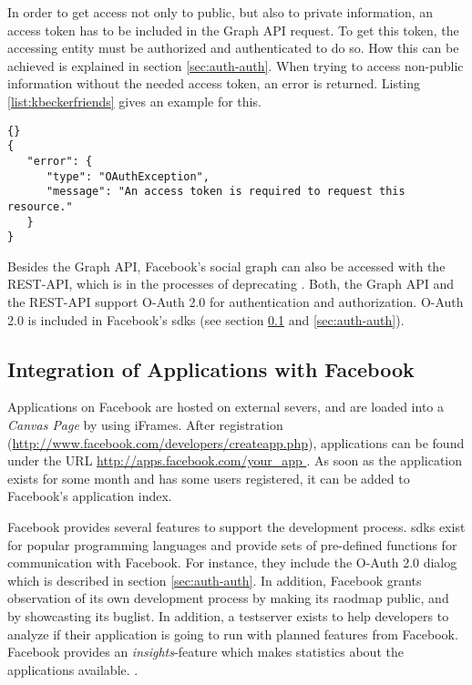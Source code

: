 \documentclass[preprint,12pt]{elsarticle}
\begin{document}
In order to get access not only to public, but also to private
information, an access token has to be included in the Graph API
request. To get this token, the accessing entity must be
authorized and authenticated to do so. How this can be achieved is
explained in section \ref{sec:auth-auth}. When trying to access
non-public information without the needed access token, an error
is returned. Listing \ref{list:kbeckerfriends} gives an example for this.


\begin{lstlisting}[caption=JSON object from
  \url{https://graph.facebook.com/681178092/friends},
  label=list:kbeckerfriends]{}
{
   "error": {
      "type": "OAuthException",
      "message": "An access token is required to request this resource."
   }
}
\end{lstlisting}


Besides the Graph API, Facebook's social graph can also be accessed
with the REST-API, which is in the processes of deprecating
\cite{facebookDev3}. Both, the Graph API and the REST-API support
O-Auth 2.0 for authentication and authorization. O-Auth 2.0 is
included in Facebook's \ac{sdks} (see section
\ref{sec:integr-appl-with} and \ref{sec:auth-auth}).




\subsection{Integration of Applications with Facebook}
\label{sec:integr-appl-with}
Applications on Facebook are hosted on external severs, and are loaded
into a \textit{Canvas Page} by using iFrames. After registration
(\url{http://www.facebook.com/developers/createapp.php}), applications
can be found under the URL \url{http://apps.facebook.com/your_app }.
As soon as the application exists for some month and has
some users registered, it can be added to Facebook's application
index. 

Facebook provides several features to support the development
process. \ac{sdks} exist for popular programming languages and provide
sets of pre-defined functions for communication with Facebook. For
instance, they include the O-Auth 2.0 dialog which is described in
section \ref{sec:auth-auth}. In
addition, Facebook grants observation of its own development process by
making its raodmap public, and by showcasting its buglist. In addition, a
testserver exists to help developers to analyze if their application
is going to run with planned features from Facebook. 
Facebook provides an \textit{insights}-feature which makes
statistics about the applications available. \cite{oreilly}.
\end{document}
